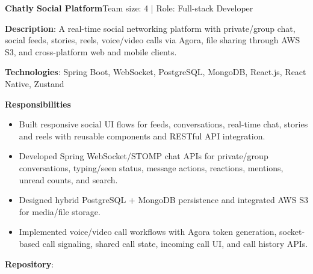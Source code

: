   \resumeProjectHeading
    {\textbf{Chatly Social Platform}}{Team size: 4 | Role: Full-stack Developer}
    \resumeItemListStart
      \item \textbf{Description}: A real-time social networking platform with private/group chat, social feeds, stories, reels,
        voice/video calls via Agora, file sharing through AWS S3, and cross-platform web and mobile clients.
      \item \textbf{Technologies}: Spring Boot, WebSocket, PostgreSQL, MongoDB, React.js, React Native, Zustand
      \item \textbf{Responsibilities}
        \begin{itemize}
          \item Built responsive social UI flows for feeds, conversations, real-time chat, stories and reels with reusable components and RESTful API integration.
          \item Developed Spring WebSocket/STOMP chat APIs for private/group conversations, typing/seen status, message actions, reactions, mentions, unread counts, and search.
          \item Designed hybrid PostgreSQL + MongoDB persistence and integrated AWS S3 for media/file storage.
          \item Implemented voice/video call workflows with Agora token generation, socket-based call signaling, shared call state, incoming call UI, and call history APIs.
        \end{itemize}
      \item \textbf{Repository}: \href{https://github.com/nvminh162/chatly-social-platform}{}
    \resumeItemListEnd

\resumeSubHeadingListEnd
